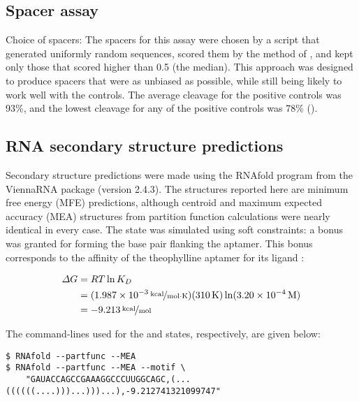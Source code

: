 \documentclass[10pt,oneside]{article}
\begin{document}
\subsection{Spacer assay}

Choice of spacers: The spacers for this assay were chosen by a script that generated uniformly random sequences, scored them by the method of , and kept only those that scored higher than 0.5 (the median).  This approach was designed to produce spacers that were as unbiased as possible, while still being likely to work well with the controls.  The average cleavage for the positive controls was 93\%, and the lowest cleavage for any of the positive controls was 78\% ().

\subsection{RNA secondary structure predictions}

Secondary structure predictions were made using the RNAfold program from the ViennaRNA package (version 2.4.3).  The structures reported here are minimum free energy (MFE) predictions, although centroid and maximum expected accuracy (MEA) structures from partition function calculations were nearly identical in every case.  The \holo{} state was simulated using soft constraints: a  bonus was granted for forming the base pair flanking the aptamer.  This bonus corresponds to the  affinity of the theophylline aptamer for its ligand \autocite{jenison1994}:

\begin{align*}
\Delta G
    &= RT \ln K_D \\
    &= (\unitfrac[\mathrm{1.987 \times 10^{-3}}]{kcal}{mol \cdot K}) 
       (\unit[\mathrm{310}]{K}) 
       \ln (\unit[\mathrm{3.20 \times 10^{-4}}]{M}) \\
    &= \unitfrac[\mathrm{-9.213}]{kcal}{mol} \\
\end{align*}

The command-lines used for the \apo{} and \holo{} states, respectively, are given below:

\begin{verbatim}
$ RNAfold --partfunc --MEA
$ RNAfold --partfunc --MEA --motif \
    "GAUACCAGCCGAAAGGCCCUUGGCAGC,(...((((((....)))...)))...),-9.212741321099747"
\end{verbatim}
\end{document}

